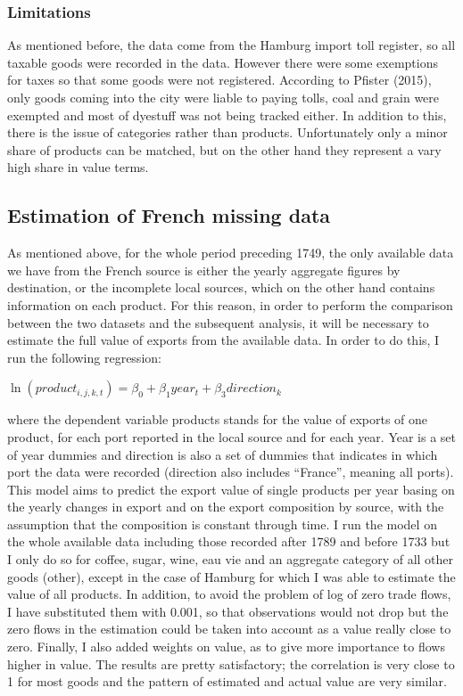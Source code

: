 \documentclass[12pt,a4paper,titlepage,english]{article}
\begin{document}
\subsubsection{Limitations}
As mentioned before, the data come from the Hamburg import toll register, so all taxable goods were recorded in the data. However there were some exemptions for taxes so that some goods were not registered. According to Pfister (2015), only goods coming into the city were liable to paying tolls, coal and grain were exempted and most of dyestuff was not being tracked either. In addition to this, there is the issue of categories rather than products. Unfortunately only a minor share of products can be matched, but on the other hand they represent a vary high share in value terms. 

\subsection{Estimation of French missing data}
As mentioned above, for the whole period preceding 1749, the only available data we have from the French source is either the yearly aggregate figures by destination, or the incomplete local sources, which on the other hand contains information on each product. For this reason, in order to perform the comparison between the two datasets and the subsequent analysis, it will be necessary to estimate the full value of exports from the available data. In order to do this, I run the following regression:
\begin{center}
$\ln(product_{i,j,k,t})=\beta_0 + \beta_1year_t+\beta_3direction_k$
\end{center}
where the dependent variable products stands for the value of exports of one product, for each port reported in the local source and for each year. Year is a set of year dummies and direction is also a set of dummies that indicates in which port the data were recorded (direction also includes “France”, meaning all ports). This model aims to predict the export value of single products per year basing on the yearly changes in export and on the export composition by source, with the assumption that the composition is constant through time. I run the model on the whole available data including those recorded after 1789 and before 1733 but I only do so for coffee, sugar, wine, eau vie and an aggregate category of all other goods (other), except in the case of Hamburg for which I was able to estimate the value of all products. In addition, to avoid the problem of log of zero trade flows, I have substituted them with 0.001, so that observations would not drop but the zero flows in the estimation could be taken into account as a value really close to zero. Finally, I also added weights on value, as to give more importance to flows higher in value. The results are pretty satisfactory; the correlation is very close to 1 for most goods and the pattern of estimated and actual value are very similar. 
\end{document}
